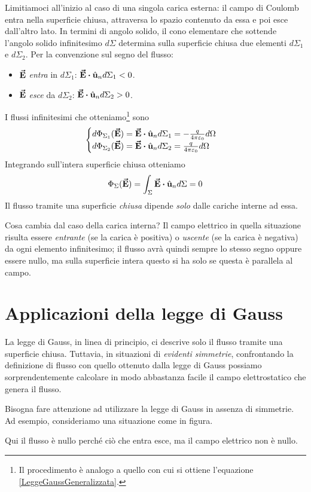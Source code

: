 Limitiamoci all'inizio al caso di una singola carica esterna: il campo di Coulomb entra nella superficie chiusa, attraversa lo spazio contenuto da essa e poi esce dall'altro lato. In termini di angolo solido, il cono elementare che sottende l'angolo solido infinitesimo $d\Sigma$ determina sulla superficie chiusa due elementi $d\Sigma_1$ e $d\Sigma_2$. Per la convenzione sul segno del flusso:
\begin{itemize}
	\item $\vb*{\va{E}}$ \textit{entra} in $d\Sigma_1$: $\vba{E}\vdot \vbh{u}_n d\Sigma_1<0$.
	\item $\vb*{\va{E}}$ \textit{esce} da $d\Sigma_2$: $\vba{E}\vdot \vbh{u}_n d\Sigma_2>0$.
\end{itemize}
I flussi infinitesimi che otteniamo\footnote{Il procedimento è analogo a quello con cui si ottiene l'equazione \ref{LeggeGaussGeneralizzata}.} sono
\begin{equation*}
	\begin{cases}
		d\Phi_{\Sigma_1}(\vba{E})=\vba{E}\vdot \vbh{u}_n d\Sigma_1=-\frac{q}{4\pi\epsilon_0}d\Omega\\
		d\Phi_{\Sigma_2}(\vba{E})=\vba{E}\vdot \vbh{u}_n d\Sigma_2=\frac{q}{4\pi\epsilon_0}d\Omega
	\end{cases}
\end{equation*}
Integrando sull'intera superficie chiusa otteniamo
\begin{equation}
	\Phi_\Sigma(\vba{E})=\int_{\Sigma}\vba{E}\vdot\vbh{u}_nd\Sigma=0
\end{equation}
Il flusso tramite una superficie \textit{chiusa} dipende \textit{solo} dalle cariche interne ad essa.
\begin{observe}
	Cosa cambia dal caso della carica interna? Il campo elettrico in quella situazione risulta essere \textit{entrante} (se la carica è positiva) o \textit{uscente} (se la carica è negativa) da ogni elemento infinitesimo; il flusso avrà quindi sempre lo stesso segno oppure essere nullo, ma sulla superficie intera questo si ha solo se questa è parallela al campo.   
\end{observe}
\section{Applicazioni della legge di Gauss}
La legge di Gauss, in linea di principio, ci descrive solo il flusso tramite una superficie chiusa. Tuttavia, in situazioni di \textit{evidenti simmetrie}, confrontando la definizione di flusso con quello ottenuto dalla legge di Gauss possiamo sorprendentemente calcolare in modo abbastanza facile il campo elettrostatico che genera il flusso.
\begin{attention} %
	Bisogna fare attenzione ad utilizzare la legge di Gauss in assenza di simmetrie. Ad esempio, consideriamo una situazione come in figura.
	
	Qui il flusso è nullo perché ciò che entra esce, ma il campo elettrico non è nullo.
\end{attention}
